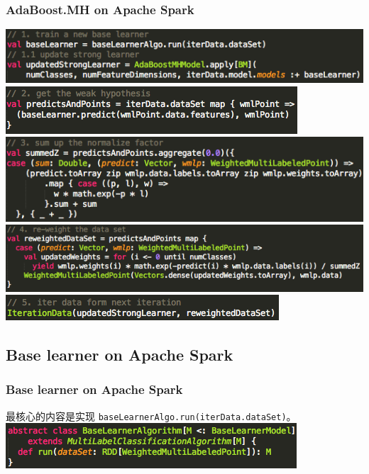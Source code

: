 \documentclass{beamer}
\begin{document}
\begin{frame}
\frametitle{AdaBoost.MH on Apache Spark}
\includegraphics[scale=0.5,left]{img/a1_train_base.png} \\
\includegraphics[scale=0.5,left]{img/a2_hypoth.png} \\
\includegraphics[scale=0.5,left]{img/a3_sumz.png} \\
\includegraphics[scale=0.5,left]{img/a4_reweighting.png} \\
\includegraphics[scale=0.5,left]{img/a5_nextiter.png} 
\end{frame}

\subsection{Base learner on Apache Spark}

\begin{frame}
\frametitle{Base learner on Apache Spark}
最核心的内容是实现 {\color{blue} \texttt{baseLearnerAlgo.run(iterData.dataSet)}}。 \\
\includegraphics[scale=0.5,left]{img/base_algo.png}
\end{frame}
\end{document}
